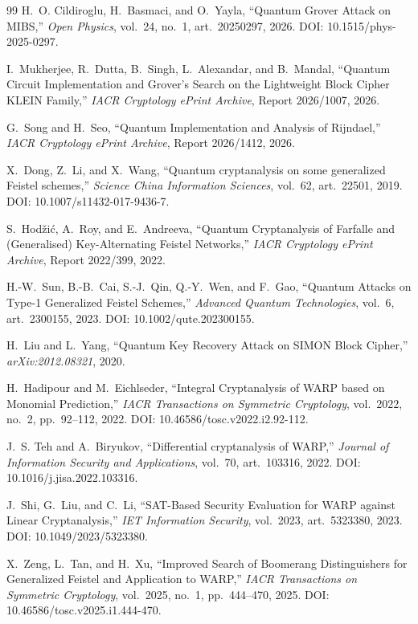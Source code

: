 \documentclass[10pt,a4paper]{article}
\begin{document}
\begin{thebibliography}{99}
H.~O. Cildiroglu, H.~Basmaci, and O.~Yayla,
``Quantum Grover Attack on MIBS,''
\emph{Open Physics}, vol.~24, no.~1, art.~20250297, 2026.
DOI: 10.1515/phys-2025-0297.

I.~Mukherjee, R.~Dutta, B.~Singh, L.~Alexandar, and B.~Mandal,
``Quantum Circuit Implementation and Grover's Search on the Lightweight Block Cipher KLEIN Family,''
\emph{IACR Cryptology ePrint Archive}, Report 2026/1007, 2026.

G.~Song and H.~Seo,
``Quantum Implementation and Analysis of Rijndael,''
\emph{IACR Cryptology ePrint Archive}, Report 2026/1412, 2026.

X.~Dong, Z.~Li, and X.~Wang,
``Quantum cryptanalysis on some generalized Feistel schemes,''
\emph{Science China Information Sciences}, vol.~62, art.~22501, 2019.
DOI: 10.1007/s11432-017-9436-7.

S.~Hod\v{z}i\'c, A.~Roy, and E.~Andreeva,
``Quantum Cryptanalysis of Farfalle and (Generalised) Key-Alternating Feistel Networks,''
\emph{IACR Cryptology ePrint Archive}, Report 2022/399, 2022.

H.-W.~Sun, B.-B.~Cai, S.-J.~Qin, Q.-Y.~Wen, and F.~Gao,
``Quantum Attacks on Type-1 Generalized Feistel Schemes,''
\emph{Advanced Quantum Technologies}, vol.~6, art.~2300155, 2023.
DOI: 10.1002/qute.202300155.

H.~Liu and L.~Yang,
``Quantum Key Recovery Attack on SIMON Block Cipher,''
\emph{arXiv:2012.08321}, 2020.


H.~Hadipour and M.~Eichlseder,
``Integral Cryptanalysis of WARP based on Monomial Prediction,''
\emph{IACR Transactions on Symmetric Cryptology}, vol.~2022, no.~2, pp.~92--112, 2022.
DOI: 10.46586/tosc.v2022.i2.92-112.

J.~S. Teh and A.~Biryukov,
``Differential cryptanalysis of WARP,''
\emph{Journal of Information Security and Applications}, vol.~70, art.~103316, 2022.
DOI: 10.1016/j.jisa.2022.103316.

J.~Shi, G.~Liu, and C.~Li,
``SAT-Based Security Evaluation for WARP against Linear Cryptanalysis,''
\emph{IET Information Security}, vol.~2023, art.~5323380, 2023.
DOI: 10.1049/2023/5323380.

X.~Zeng, L.~Tan, and H.~Xu,
``Improved Search of Boomerang Distinguishers for Generalized Feistel and Application to WARP,''
\emph{IACR Transactions on Symmetric Cryptology}, vol.~2025, no.~1, pp.~444--470, 2025.
DOI: 10.46586/tosc.v2025.i1.444-470.


\end{thebibliography}
\end{document}
